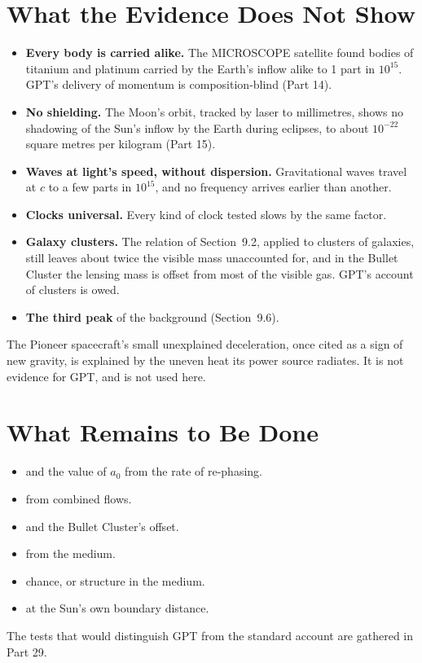 \documentclass[11pt,a4paper]{article}
\begin{document}
\section{What the Evidence Does Not Show}

\begin{itemize}
\item \textbf{Every body is carried alike.} The MICROSCOPE satellite found bodies of titanium and platinum carried by the Earth's inflow alike to 1 part in $10^{15}$. GPT's delivery of momentum is composition-blind (Part 14).
\item \textbf{No shielding.} The Moon's orbit, tracked by laser to millimetres, shows no shadowing of the Sun's inflow by the Earth during eclipses, to about $10^{-22}$ square metres per kilogram (Part 15).
\item \textbf{Waves at light's speed, without dispersion.} Gravitational waves travel at $c$ to a few parts in $10^{15}$, and no frequency arrives earlier than another.
\item \textbf{Clocks universal.} Every kind of clock tested slows by the same factor.
\item \textbf{Galaxy clusters.} The relation of Section~9.2, applied to clusters of galaxies, still leaves about twice the visible mass unaccounted for, and in the Bullet Cluster the lensing mass is offset from most of the visible gas. GPT's account of clusters is owed.
\item \textbf{The third peak} of the background (Section~9.6).
\end{itemize}

 The Pioneer spacecraft's small unexplained deceleration, once cited as a sign of new gravity, is explained by the uneven heat its power source radiates. It is not evidence for GPT, and is not used here.

\section{What Remains to Be Done}

\begin{itemize}
\item {} and the value of $a_0$ from the rate of re-phasing.
\item {} from combined flows.
\item {} and the Bullet Cluster's offset.
\item {} from the medium.
\item {} chance, or structure in the medium.
\item {} at the Sun's own boundary distance.
\end{itemize}
The tests that would distinguish GPT from the standard account are gathered in Part 29.
\end{document}
